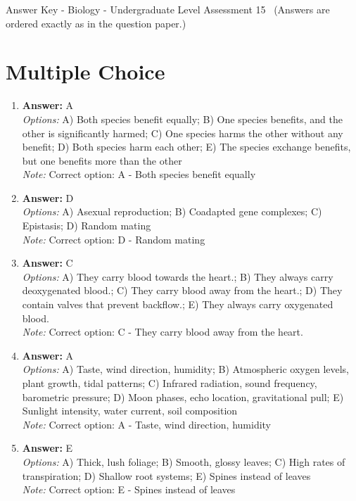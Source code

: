 \documentclass[12pt]{article}
\begin{document}
\begin{center}
Answer Key - Biology - Undergraduate Level Assessment 15 \
\small (Answers are ordered exactly as in the question paper.)
\end{center}

\section*{Multiple Choice}
\begin{enumerate}[label=\arabic*.]
\item \textbf{Answer:} A
\\ \textit{Options:} A) Both species benefit equally; B) One species benefits, and the other is significantly harmed; C) One species harms the other without any benefit; D) Both species harm each other; E) The species exchange benefits, but one benefits more than the other
\\ \textit{Note:} Correct option: A - Both species benefit equally
\item \textbf{Answer:} D
\\ \textit{Options:} A) Asexual reproduction; B) Coadapted gene complexes; C) Epistasis; D) Random mating
\\ \textit{Note:} Correct option: D - Random mating
\item \textbf{Answer:} C
\\ \textit{Options:} A) They carry blood towards the heart.; B) They always carry deoxygenated blood.; C) They carry blood away from the heart.; D) They contain valves that prevent backflow.; E) They always carry oxygenated blood.
\\ \textit{Note:} Correct option: C - They carry blood away from the heart.
\item \textbf{Answer:} A
\\ \textit{Options:} A) Taste, wind direction, humidity; B) Atmospheric oxygen levels, plant growth, tidal patterns; C) Infrared radiation, sound frequency, barometric pressure; D) Moon phases, echo location, gravitational pull; E) Sunlight intensity, water current, soil composition
\\ \textit{Note:} Correct option: A - Taste, wind direction, humidity
\item \textbf{Answer:} E
\\ \textit{Options:} A) Thick, lush foliage; B) Smooth, glossy leaves; C) High rates of transpiration; D) Shallow root systems; E) Spines instead of leaves
\\ \textit{Note:} Correct option: E - Spines instead of leaves
\end{enumerate}
\end{document}
